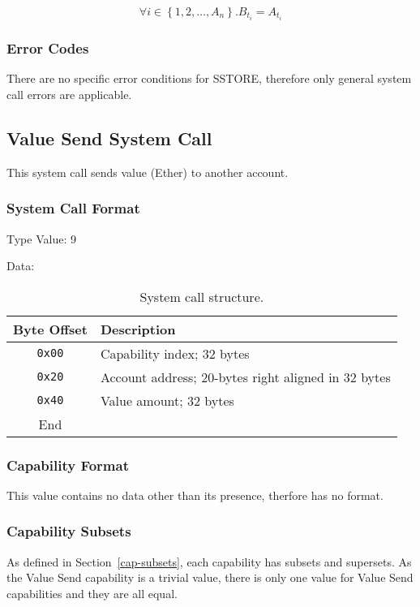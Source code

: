 \documentclass[english,a4paper]{article}
\let\oldparagraph\subsubsection
\renewcommand{\subsubsection}[1]{\oldparagraph{#1}\mbox{}}
\begin{document}
$$ \forall i \in \left\{1,2,\dots ,A_n\right\}. B_{t_i} = A_{t_i} $$

\subsubsection{Error Codes}
There are no specific error conditions for SSTORE, therefore only general system
call errors are applicable.

\subsection{Value Send System Call}
This system call sends value (Ether) to another account.

\subsubsection{System Call Format}
Type Value: 9

Data:

\begin{table}[H]
  \caption{System call structure.}
  \centering{}%
  \begin{tabularx}{\textwidth}{c|X}
    \hline
    Byte Offset & Description\\
    \hline
    \hline
    \texttt{0x00}& Capability index; 32 bytes \\
    \texttt{0x20} & Account address; 20-bytes right aligned in 32 bytes \\
    \texttt{0x40} & Value amount; 32 bytes \\
    \hline
    End &  \\
    \hline
  \end{tabularx}
\end{table}

\subsubsection{Capability Format}
This value contains no data other than its presence, therfore has no format.

\subsubsection{Capability Subsets}
As defined in Section~\ref{cap-subsets}, each capability has subsets and
supersets. As the Value Send capability is a trivial value, there is only one
value for Value Send capabilities and they are all equal.
\end{document}
